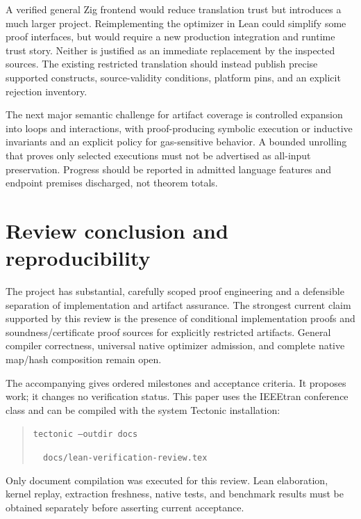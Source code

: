 \documentclass[conference]{IEEEtran}
\newcommand{\src}[1]{\path{#1}}
\begin{document}
A verified general Zig frontend would reduce translation trust but introduces
a much larger project. Reimplementing the optimizer in Lean could simplify
some proof interfaces, but would require a new production integration and
runtime trust story. Neither is justified as an immediate replacement by the
inspected sources. The existing restricted translation should instead publish
precise supported constructs, source-validity conditions, platform pins, and
an explicit rejection inventory.

The next major semantic challenge for artifact coverage is controlled expansion
into loops and interactions, with proof-producing symbolic execution or
inductive invariants and an explicit policy for gas-sensitive behavior. A
bounded unrolling that proves only selected executions must not be advertised
as all-input preservation. Progress should be reported in admitted language
features and endpoint premises discharged, not theorem totals.

\section{Review conclusion and reproducibility}
The project has substantial, carefully scoped proof engineering and a
defensible separation of implementation and artifact assurance. The strongest
current claim supported by this review is the presence of conditional
implementation proofs and soundness/certificate proof sources for explicitly
restricted artifacts. General compiler correctness, universal native optimizer
admission, and complete native map/hash composition remain open.

The accompanying \src{lean-verification-next-steps.md} gives ordered milestones
and acceptance criteria. It proposes work; it changes no verification status.
This paper uses the IEEEtran conference class and can be compiled with the
system Tectonic installation:
\begin{quote}\small
\texttt{tectonic --outdir docs}\par
\texttt{\ \ docs/lean-verification-review.tex}
\end{quote}
Only document compilation was executed for this review. Lean elaboration,
kernel replay, extraction freshness, native tests, and benchmark results must
be obtained separately before asserting current acceptance.
\end{document}
